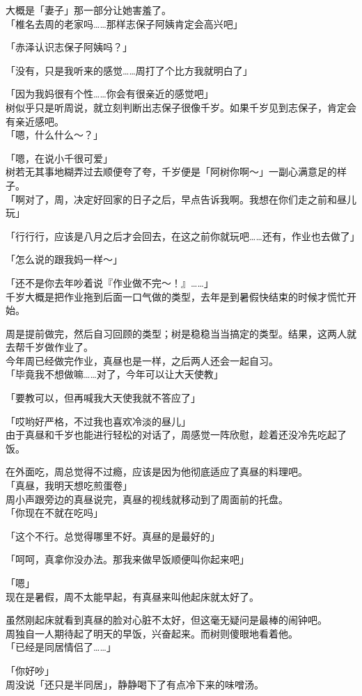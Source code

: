 大概是「妻子」那一部分让她害羞了。\\

「椎名去周的老家吗……那样志保子阿姨肯定会高兴吧」

「赤泽认识志保子阿姨吗？」

「没有，只是我听来的感觉……周打了个比方我就明白了」

「因为我妈很有个性……你会有很亲近的感觉吧」\\

树似乎只是听周说，就立刻判断出志保子很像千岁。如果千岁见到志保子，肯定会有亲近感吧。\\

「嗯，什么什么～？」

「嗯，在说小千很可爱」\\

树若无其事地糊弄过去顺便夸了夸，千岁便是「阿树你啊～」一副心满意足的样子。\\

「啊对了，周，决定好回家的日子之后，早点告诉我啊。我想在你们走之前和昼儿玩」

「行行行，应该是八月之后才会回去，在这之前你就玩吧……还有，作业也去做了」

「怎么说的跟我妈一样～」

「还不是你去年吵着说『作业做不完～！』……」\\

千岁大概是把作业拖到后面一口气做的类型，去年是到暑假快结束的时候才慌忙开始。

周是提前做完，然后自习回顾的类型；树是稳稳当当搞定的类型。结果，这两人就去帮千岁做作业了。\\

今年周已经做完作业，真昼也是一样，之后两人还会一起自习。\\

「毕竟我不想做嘛……对了，今年可以让大天使教」

「要教可以，但再喊我大天使我就不答应了」

「哎哟好严格，不过我也喜欢冷淡的昼儿」\\

由于真昼和千岁也能进行轻松的对话了，周感觉一阵欣慰，趁着还没冷先吃起了饭。

在外面吃，周总觉得不过瘾，应该是因为他彻底适应了真昼的料理吧。\\

「真昼，我明天想吃煎蛋卷」\\

周小声跟旁边的真昼说完，真昼的视线就移动到了周面前的托盘。\\

「你现在不就在吃吗」

「这个不行。总觉得哪里不好。真昼的是最好的」

「呵呵，真拿你没办法。那我来做早饭顺便叫你起来吧」

「嗯」\\

现在是暑假，周不太能早起，有真昼来叫他起床就太好了。

虽然刚起床就看到真昼的脸对心脏不太好，但这毫无疑问是最棒的闹钟吧。\\

周独自一人期待起了明天的早饭，兴奋起来。而树则傻眼地看着他。\\

「已经是同居情侣了……」

「你好吵」\\

周没说「还只是半同居」，静静喝下了有点冷下来的味噌汤。
